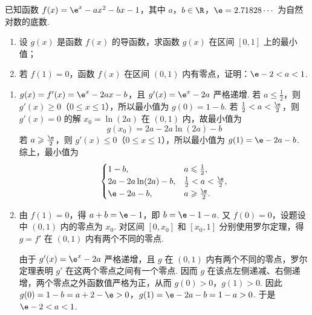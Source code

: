 \begin{problem}
已知函数 \(f(x) = \e^{x} - ax^{2} - bx - 1\)，其中 \(a\)，\(b \in \R\)，\(\e = 2.71828\cdots\) 为自然对数的底数.

\begin{enumerate}
\item 设 \(g(x)\) 是函数 \(f(x)\) 的导函数，求函数 \(g(x)\) 在区间 \([0,1]\) 上的最小值；
\item 若 \(f(1)=0\)，函数 \(f(x)\) 在区间 \((0,1)\) 内有零点，证明：\(\e - 2 < a < 1\).
\end{enumerate}

\begin{solution}
\begin{enumerate}
\item \(g(x)=f'(x)=\e^x-2ax-b\)，且 \(g'(x)=\e^x-2a\) 严格递增. 若 \(a\leqslant\frac12\)，则 \(g'(x)\geqslant0\)（\(0\leqslant x\leqslant1\)），所以最小值为 \(g(0)=1-b\). 若 \(\frac12<a<\frac\e2\)，则 \(g'(x)=0\) 的解 \(x_0=\ln(2a)\) 在 \((0,1)\) 内，故最小值为
\[
g(x_0)=2a-2a\ln(2a)-b
\]
若 \(a\geqslant\frac\e2\)，则 \(g'(x)\leqslant0\)（\(0\leqslant x\leqslant1\)），所以最小值为 \(g(1)=\e-2a-b\). 综上，最小值为
\[
\begin{cases}
1-b, & a\leqslant\frac12,\\
2a-2a\ln(2a)-b, & \frac12<a<\frac\e2,\\
\e-2a-b, & a\geqslant\frac\e2.
\end{cases}
\]
\item 由 \(f(1)=0\)，得 \(a+b=\e-1\)，即 \(b=\e-1-a\). 又 \(f(0)=0\)，设题设中 \((0,1)\) 内的零点为 \(x_0\). 对区间 \([0,x_0]\) 和 \([x_0,1]\) 分别使用罗尔定理，得 \(g=f'\) 在 \((0,1)\) 内有两个不同的零点.

由于 \(g'(x)=\e^x-2a\) 严格递增，且 \(g\) 在 \((0,1)\) 内有两个不同的零点，罗尔定理表明 \(g'\) 在这两个零点之间有一个零点. 因而 \(g\) 在该点左侧递减、右侧递增，两个零点之外函数值严格为正，从而 \(g(0)>0\)，\(g(1)>0\). 因此
\(g(0)=1-b=a+2-\e>0\)，\(g(1)=\e-2a-b=1-a>0\).
于是 \(\e-2<a<1\).
\end{enumerate}
\end{solution}
\end{problem}
